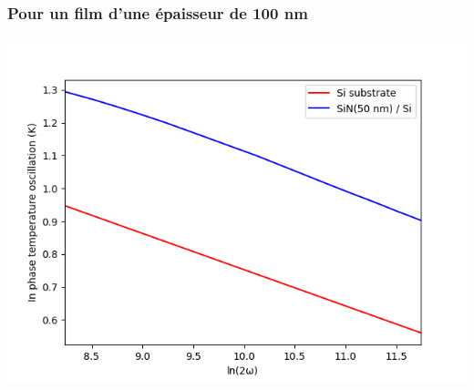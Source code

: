 \documentclass[10pt,a4paper]{report}
\begin{document}
\subsubsection{Pour un film d'une épaisseur de 100 nm}
\begin{center}
\includegraphics[scale=0.7]{50nm.png}
\end{center}
\end{document}
